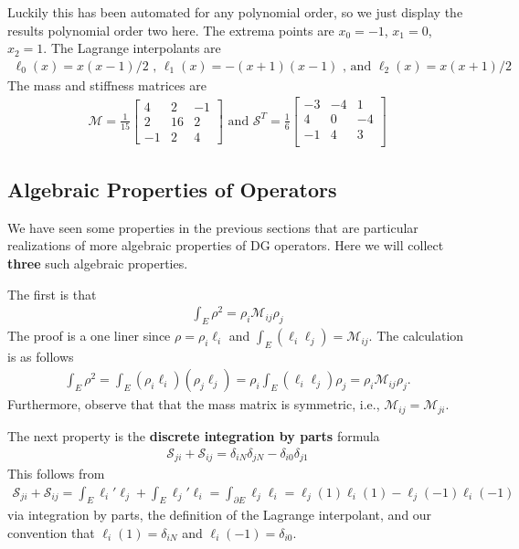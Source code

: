 \documentclass{report}
\numberwithin{equation}{section}
\begin{document}
Luckily this has been automated for any polynomial order, so we just display the results polynomial order two here. The extrema points are $x_0 = -1$, $x_1 = 0$, $x_2 = 1$. The Lagrange interpolants are
\begin{align}
    \ell_0(x) = x(x-1)/2 
    \text{ , }
    \ell_1(x) = -(x+1)(x-1) 
    \text{ , and }
    \ell_2(x) = x(x+1) / 2
\end{align}
The mass and stiffness matrices are
\begin{align}
    \mathcal{M} = \frac{1}{15}
    \begin{bmatrix}
      4  & 2 & -1 \\
  2  & 16  &  2 \\
 -1 &  2 &  4
    \end{bmatrix}
    \text{ and }
    \mathcal{S}^T = 
    \frac{1}{6}
    \begin{bmatrix}
     -3  &-4         &  1 \\
  4  & 0  & -4 \\
 -1   &4         &  3 \\
    \end{bmatrix}
\end{align}

\subsection{Algebraic Properties of Operators}
We have seen some properties in the previous sections that are particular realizations of more algebraic properties of DG operators. Here we will collect \textbf{three} such algebraic properties.

The first is that
\begin{align}
    \int_{E} \rho^2 = \rho_i \mathcal{M}_{ij} \rho_j
\end{align}
The proof is a one liner since $\rho = \rho_i \ell_i$ and $\int_{E}  (\ell_i \ell_j ) = \mathcal{M}_{ij}$. The calculation is as follows
\begin{align}
  \int_{E} \rho^2  = \int_{E} (\rho_i \ell_i) (\rho_j \ell_j ) =  \rho_i \int_{E}  (\ell_i \ell_j ) \rho_j = \rho_i \mathcal{M}_{ij} \rho_j.
\end{align}
Furthermore, observe that that the mass matrix is symmetric, i.e., $\mathcal{M}_{ij} = \mathcal{M}_{ji}$.

The next property is the \textbf{discrete integration by parts} formula
\begin{align}
    \mathcal{S}_{ji} + \mathcal{S}_{ij} = \delta_{iN}\delta_{jN} - \delta_{i0}\delta_{j1}
\end{align}
This follows from
\begin{align}
   \mathcal{S}_{ji} + \mathcal{S}_{ij} = \int_{E} \ell_{i}' \ell_j + \int_{E} \ell_j' \ell_i = \int_{\partial E } \ell_j \ell_i = \ell_j(1) \ell_i(1) - \ell_j(-1) \ell_i(-1)
\end{align}
via integration by parts, the definition of the Lagrange interpolant, and our convention that $\ell_i(1) = \delta_{iN}$ and $\ell_i(-1) = \delta_{i0}$. 
\end{document}
